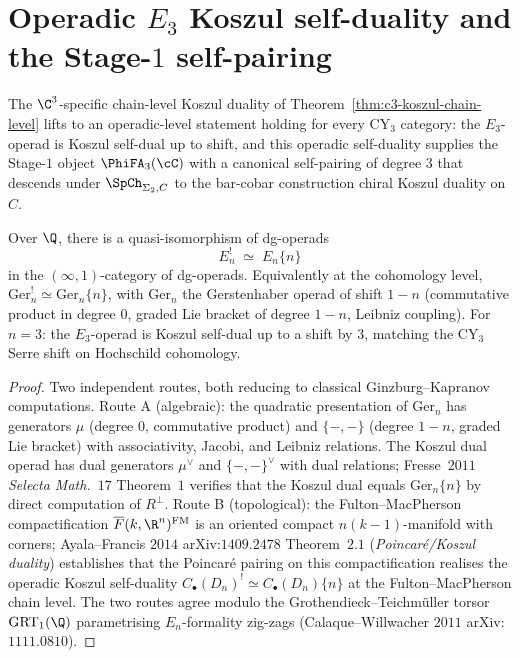 \section{Operadic \texorpdfstring{$E_3$}{E-3} Koszul self-duality and the Stage-\texorpdfstring{$1$}{1} self-pairing}
\label{sec:e3-operadic-self-duality}

The $\C^3$-specific chain-level Koszul duality of
Theorem~\ref{thm:c3-koszul-chain-level} lifts to an operadic-level
statement holding for every CY$_3$ category: the $E_3$-operad is
Koszul self-dual up to shift, and this operadic self-duality
supplies the Stage-$1$ object $\PhiFA_3(\cC)$ with a canonical
self-pairing of degree $3$ that descends under $\SpCh_{\Sigma_2, C}$
to the bar-cobar construction chiral Koszul duality on $C$.

\begin{theorem}
\label{thm:en-koszul-self-duality-shift}
Over $\Q$, there is a quasi-isomorphism of dg-operads
\[
 E_n^{!} \;\simeq\; E_n\{n\}
\]
in the $(\infty,1)$-category of dg-operads. Equivalently at the
cohomology level, $\mathrm{Ger}_n^{!} \simeq \mathrm{Ger}_n\{n\}$, with
$\mathrm{Ger}_n$ the Gerstenhaber operad of shift $1 - n$ (commutative
product in degree $0$, graded Lie bracket of degree $1 - n$, Leibniz
coupling). For $n = 3$: the $E_3$-operad is Koszul self-dual up to a
shift by $3$, matching the CY$_3$ Serre shift on Hochschild cohomology.
\end{theorem}

\begin{proof}
Two independent routes, both reducing to classical Ginzburg--Kapranov
computations. Route A (algebraic): the quadratic presentation of
$\mathrm{Ger}_n$ has generators $\mu$ (degree $0$, commutative product)
and $\{-, -\}$ (degree $1 - n$, graded Lie bracket) with associativity,
Jacobi, and Leibniz relations. The Koszul dual operad has dual
generators $\mu^\vee$ and $\{-, -\}^\vee$ with dual relations;
Fresse~$2011$ \textit{Selecta Math.}~$17$ Theorem~$1$ verifies that
the Koszul dual equals $\mathrm{Ger}_n\{n\}$ by direct computation of
$R^\perp$. Route B (topological): the Fulton--MacPherson compactification
$\overline{F}(k, \R^n)^{\mathrm{FM}}$ is an oriented compact
$n(k-1)$-manifold with corners; Ayala--Francis $2014$ arXiv:$1409.2478$
Theorem~$2.1$ (\emph{Poincar\'e/Koszul duality}) establishes that the
Poincar\'e pairing on this compactification realises the operadic
Koszul self-duality $C_\bullet(D_n)^{!} \simeq C_\bullet(D_n)\{n\}$ at
the Fulton--MacPherson chain level. The two routes agree modulo the
Grothendieck--Teichm\"uller torsor $\mathrm{GRT}_1(\Q)$ parametrising
$E_n$-formality zig-zags (Calaque--Willwacher $2011$ arXiv:$1111.0810$).
\end{proof}

